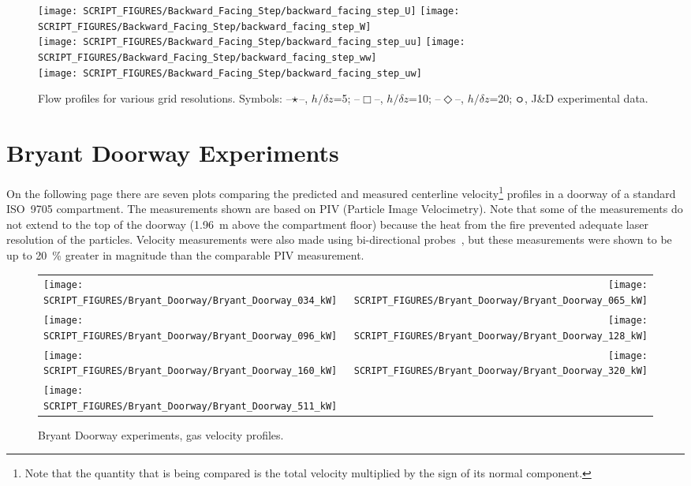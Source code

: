 \begin{figure}[!htb]
    \centering
    \texttt{[image: SCRIPT\_FIGURES/Backward\_Facing\_Step/backward\_facing\_step\_U]}
    \texttt{[image: SCRIPT\_FIGURES/Backward\_Facing\_Step/backward\_facing\_step\_W]}\\
    \texttt{[image: SCRIPT\_FIGURES/Backward\_Facing\_Step/backward\_facing\_step\_uu]}
    \texttt{[image: SCRIPT\_FIGURES/Backward\_Facing\_Step/backward\_facing\_step\_ww]}\\
    \texttt{[image: SCRIPT\_FIGURES/Backward\_Facing\_Step/backward\_facing\_step\_uw]}
    \caption[Flow profiles]{Flow profiles for various grid resolutions.  Symbols: --$\mathlarger{\mathlarger{\star}}$--, $h/\delta z$=5; --$\Box$--, $h/\delta z$=10; --$\Diamond$--, $h/\delta z$=20; $\mathlarger{\mathlarger{\boldsymbol\circ}}$, J\&D experimental data.}
    \label{fig:flow_profiles}
\end{figure}


\clearpage

\section{Bryant Doorway Experiments}

On the following page there are seven plots comparing the predicted and measured centerline velocity\footnote{Note that the quantity that is being compared is the total velocity multiplied by the sign of its normal component.} profiles in a doorway of a standard ISO~9705 compartment. The measurements shown are based on PIV (Particle Image Velocimetry). Note that some of the measurements do not extend to the top of the doorway (1.96~m above the compartment floor) because the heat from the fire prevented adequate laser resolution of the particles. Velocity measurements were also made using bi-directional probes~\cite{Bryant:FSJ2009}, but these measurements were shown to be up to 20~\% greater in magnitude than the comparable PIV measurement.

\newpage

\begin{figure}[p]
\begin{tabular*}{\textwidth}{l@{\extracolsep{\fill}}r}
\texttt{[image: SCRIPT\_FIGURES/Bryant\_Doorway/Bryant\_Doorway\_034\_kW]} &
\texttt{[image: SCRIPT\_FIGURES/Bryant\_Doorway/Bryant\_Doorway\_065\_kW]} \\
\texttt{[image: SCRIPT\_FIGURES/Bryant\_Doorway/Bryant\_Doorway\_096\_kW]} &
\texttt{[image: SCRIPT\_FIGURES/Bryant\_Doorway/Bryant\_Doorway\_128\_kW]} \\
\texttt{[image: SCRIPT\_FIGURES/Bryant\_Doorway/Bryant\_Doorway\_160\_kW]} &
\texttt{[image: SCRIPT\_FIGURES/Bryant\_Doorway/Bryant\_Doorway\_320\_kW]} \\
\texttt{[image: SCRIPT\_FIGURES/Bryant\_Doorway/Bryant\_Doorway\_511\_kW]} &
\end{tabular*}
\caption{Bryant Doorway experiments, gas velocity profiles.}
\label{Bryant_Doorway}
\end{figure}


